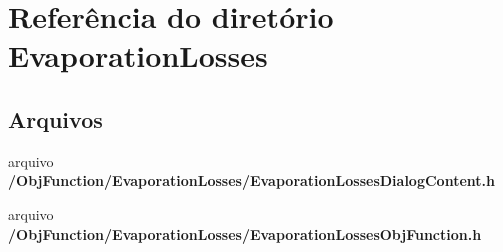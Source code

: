 \section{Referência do diretório Evaporation\+Losses}
\label{dir_7e02f9ca10348ee50475644598e43c87}
\subsection*{Arquivos}
\begin{DoxyCompactItemize}
\item 
arquivo {\bf /\+Obj\+Function/\+Evaporation\+Losses/\+Evaporation\+Losses\+Dialog\+Content.\+h}
\item 
arquivo {\bf /\+Obj\+Function/\+Evaporation\+Losses/\+Evaporation\+Losses\+Obj\+Function.\+h}
\end{DoxyCompactItemize}
